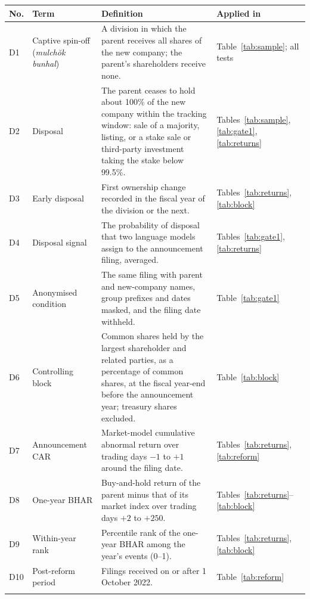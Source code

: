 \begin{tabular}{>{\raggedright\arraybackslash}p{0.6cm}>{\raggedright\arraybackslash}p{3.1cm}>{\raggedright\arraybackslash}p{7.6cm}>{\raggedright\arraybackslash}p{3.4cm}}
\toprule
No. & Term & Definition & Applied in \\
\midrule
D1 & Captive spin-off (\emph{mulchŏk bunhal}) & A division in which the parent receives all shares of the new company; the parent's shareholders receive none. & Table~\ref{tab:sample}; all tests \\ \addlinespace[1pt]
D2 & Disposal & The parent ceases to hold about 100\% of the new company within the tracking window: sale of a majority, listing, or a stake sale or third-party investment taking the stake below 99.5\%. & Tables~\ref{tab:sample}, \ref{tab:gate1}, \ref{tab:returns} \\ \addlinespace[1pt]
D3 & Early disposal & First ownership change recorded in the fiscal year of the division or the next. & Tables~\ref{tab:returns}, \ref{tab:block} \\ \addlinespace[1pt]
D4 & Disposal signal & The probability of disposal that two language models assign to the announcement filing, averaged. & Tables~\ref{tab:gate1}, \ref{tab:returns} \\ \addlinespace[1pt]
D5 & Anonymised condition & The same filing with parent and new-company names, group prefixes and dates masked, and the filing date withheld. & Table~\ref{tab:gate1} \\ \addlinespace[1pt]
D6 & Controlling block & Common shares held by the largest shareholder and related parties, as a percentage of common shares, at the fiscal year-end before the announcement year; treasury shares excluded. & Table~\ref{tab:block} \\ \addlinespace[1pt]
D7 & Announcement CAR & Market-model cumulative abnormal return over trading days $-1$ to $+1$ around the filing date. & Tables~\ref{tab:returns}, \ref{tab:reform} \\ \addlinespace[1pt]
D8 & One-year BHAR & Buy-and-hold return of the parent minus that of its market index over trading days $+2$ to $+250$. & Tables~\ref{tab:returns}--\ref{tab:block} \\ \addlinespace[1pt]
D9 & Within-year rank & Percentile rank of the one-year BHAR among the year's events (0--1). & Tables~\ref{tab:returns}, \ref{tab:block} \\ \addlinespace[1pt]
D10 & Post-reform period & Filings received on or after 1 October 2022. & Table~\ref{tab:reform} \\ \addlinespace[1pt]
\bottomrule\end{tabular}

